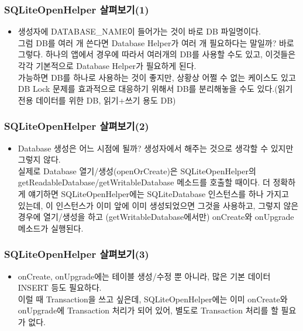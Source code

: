 \documentclass{beamer}
\begin{document}
\begin{frame}
\frametitle{SQLiteOpenHelper 살펴보기(1)}
\begin{itemize}
\item 생성자에 DATABASE\_NAME이 들어가는 것이 바로 DB 파일명이다.\\
그럼 DB를 여러 개 쓴다면 Database Helper가 여러 개 필요하다는 말일까? 바로 그렇다. 하나의 앱에서 경우에 따라서 여러개의 DB를 사용할 수도 있고, 이것들은 각각 기본적으로 Database Helper가 필요하게 된다.\\
가능하면 DB를 하나로 사용하는 것이 좋지만, 상황상 어쩔 수 없는 케이스도 있고 DB Lock 문제를 효과적으로 대응하기 위해서 DB를 분리해놓을 수도 있다.(읽기 전용 데이터를 위한 DB, 읽기+쓰기 용도 DB)
\end{itemize}
\end{frame}

\begin{frame}
\frametitle{SQLiteOpenHelper 살펴보기(2)}
\begin{itemize}
\item Database 생성은 어느 시점에 될까? 생성자에서 해주는 것으로 생각할 수 있지만 그렇지 않다.\\
실제로 Database 열기/생성(openOrCreate)은 SQLiteOpenHelper의 getReadableDatabase/getWritableDatabase 메소드를 호출할 때이다. 더 정확하게 얘기하면 SQLiteOpenHelper에는 SQLiteDatabase 인스턴스를 하나 가지고 있는데, 이 인스턴스가 이미 앞에 이미 생성되었으면 그것을 사용하고, 그렇지 않은 경우에 열기/생성을 하고 (getWritableDatabase에서만) onCreate와 onUpgrade 메소드가 실행된다.
\end{itemize}
\end{frame}

\begin{frame}
\frametitle{SQLiteOpenHelper 살펴보기(3)}
\begin{itemize}
\item onCreate, onUpgrade에는 테이블 생성/수정 뿐 아니라, 많은 기본 데이터 INSERT 등도 필요하다.\\
이럴 때 Transaction을 쓰고 싶은데, SQLiteOpenHelper에는 이미 onCreate와 onUpgrade에 Transaction 처리가 되어 있어, 별도로 Transaction 처리를 할 필요가 없다.
\end{itemize}
\end{frame}
\end{document}
